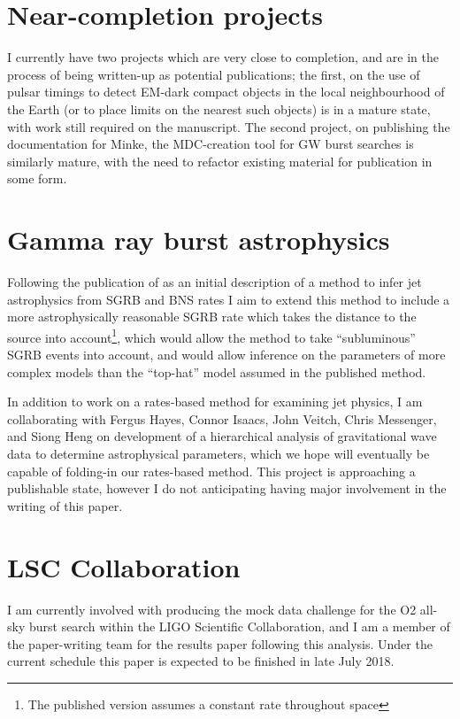 \documentclass[openleft]{kentigern}
\theoremstyle{definition}
\begin{document}
\section{Near-completion projects}

I currently have two projects which are very close to completion, and
are in the process of being written-up as potential publications; the
first, on the use of pulsar timings to detect EM-dark compact objects
in the local neighbourhood of the Earth (or to place limits on the
nearest such objects) is in a mature state, with work still required
on the manuscript. The second project, on publishing the documentation
for Minke, the MDC-creation tool for GW burst searches is similarly
mature, with the need to refactor existing material for publication in
some form.

\section{Gamma ray burst astrophysics}

Following the publication of \cite{2017arXiv171202585W} as an initial
description of a method to infer jet astrophysics from SGRB and BNS
rates I aim to extend this method to include a more astrophysically
reasonable SGRB rate which takes the distance to the source into
account\footnote{The published version assumes a constant rate
  throughout space}, which would allow the method to take
``subluminous'' SGRB events into account, and would allow inference on
the parameters of more complex models than the ``top-hat'' model
assumed in the published method.

In addition to work on a rates-based method for examining jet physics,
I am collaborating with Fergus Hayes, Connor Isaacs, John Veitch,
Chris Messenger, and Siong Heng on development of a hierarchical
analysis of gravitational wave data to determine astrophysical
parameters, which we hope will eventually be capable of folding-in our
rates-based method. This project is approaching a publishable state,
however I do not anticipating having major involvement in the writing
of this paper.

\section{LSC Collaboration}

I am currently involved with producing the mock data challenge for the
O2 all-sky burst search within the LIGO Scientific Collaboration, and
I am a member of the paper-writing team for the results paper
following this analysis. Under the current schedule this paper is
expected to be finished in late July 2018.
\end{document}
